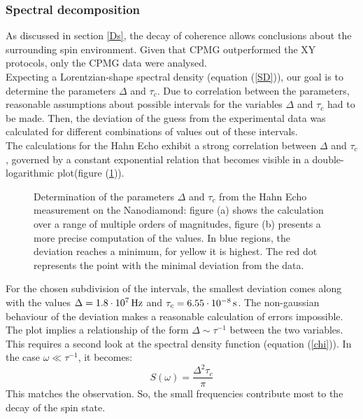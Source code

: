 \documentclass[12pt,a4paper]{article}
\begin{document}
\subsubsection{Spectral decomposition}
As discussed in section \ref{Ds}, the decay of coherence allows conclusions about the surrounding spin environment. Given that CPMG outperformed the XY protocols, only the CPMG data were analysed.\\
Expecting a Lorentzian-shape spectral density (equation (\ref{SD})), our goal is to determine the parameters $\Delta$ and $\tau_c$.
Due to correlation between the parameters, reasonable assumptions about possible intervals for the variables $\Delta$ and $\tau_c$ had to be made\cite{ssbd}. Then, the deviation of the guess from the experimental data was calculated for different combinations of values out of these intervals.\\
The calculations for the Hahn Echo exhibit a strong correlation between $\Delta$ and $\tau_c$, governed by a constant exponential relation that becomes visible in a double-logarithmic plot(figure (\ref{H})).
\begin{figure}[H]\label{H} 
    \caption{Determination of the parameters $\Delta$ and $\tau_c$ from the Hahn Echo measurement on the Nanodiamond: figure (a) shows the calculation over a range of multiple orders of magnitudes, figure (b) presents a more precise computation of the values. In blue regions, the deviation reaches a minimum, for yellow it is highest. The red dot represents the point with the minimal deviation from the data.}
\end{figure}
For the chosen subdivision of the intervals, the smallest deviation comes along with the values $\Delta=\unit[1.8\cdot 10^7]{Hz}$ and $\tau_c=\unit[6.55\cdot 10^{-8}]{s}$. The non-gaussian behaviour of the deviation makes a reasonable calculation of errors impossible.\\
The plot implies a relationship of the form $\Delta\sim\tau^{-1}$ between the two variables. This requires a second look at the spectral density function (equation (\ref{chi})). In the case $\omega\ll\tau^{-1}$, it becomes:
\begin{equation}\label{limit}
S(\omega)=\frac{\Delta^2\tau_c}{\pi}
\end{equation}
This matches the observation. So, the small frequencies contribute most to the decay of the spin state.\\
\end{document}
